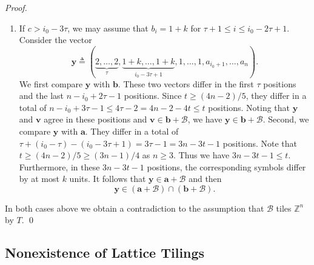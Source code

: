 \documentclass[sort&compress]{elsarticle}
\newcommand{\cB}{\mathcal{B}}
\renewcommand{\leq}{\leqslant}
\renewcommand{\geq}{\geqslant}
\newcommand{\Z}{\mathbb{Z}}
\newcommand{\vv}{\mathbf{v}}
\newcommand{\vy}{\mathbf{y}}
\newcommand{\va}{\mathbf{a}}
\newcommand{\vb}{\mathbf{b}}
\newcommand{\Zero}{{\mathbf{0}}}
\newcommand{\One}{{\mathbf{1}}}
\begin{document}
\begin{proof}
\begin{enumerate}
  \item
    If $c > i_0-3\tau$, we may assume that $b_i=1+k$ for $\tau+1 \leq
    i \leq i_0-2\tau+1$.  Consider the vector
    \[\vy\triangleq (\underbrace{2,\ldots,2}_{\tau}, \underbrace{1+k,\ldots,1+k}_{i_0-3\tau+1}, 1,\ldots,1, a_{i_0+1}, \ldots,a_n).\]
    We first compare $\vy$ with $\vb$. These two vectors differ in the
    first $\tau$ positions and the last $n-i_0+2\tau-1$
    positions. Since $t\geq (4n-2)/5$, they differ in a total of
    $n-i_0+3\tau-1 \leq 4\tau-2 = 4 n-2 -4t \leq t$ positions. Noting
    that $\vy$ and $\vv$ agree in these positions and $\vv \in
    \vb+\cB$, we have $\vy \in \vb+\cB$. Second, we compare $\vy$ with
    $\va$. They differ in a total of $\tau+
    (i_0-\tau)-(i_0-3\tau+1)=3\tau-1=  3n-3t - 1$ positions.  Note that
    $t\geq (4n-2)/5 \geq (3n-1)/4$ as $n\geq 3$. Thus we have
    $3n-3t - 1\leq t$. Furthermore, in these $3n-3t - 1$ positions, the
    corresponding symbols differ by at most $k$ units. It follows that $\vy
    \in \va +\cB$ and then
    \[ \vy\in (\va+\cB)\cap( \vb+\cB).\]
  \end{enumerate}
  
  In both cases above we obtain a contradiction to the assumption that
  $\cB$ tiles $\Z^n$ by $T$.
\qed\end{proof}



\subsection{Nonexistence of Lattice Tilings}
\end{document}

